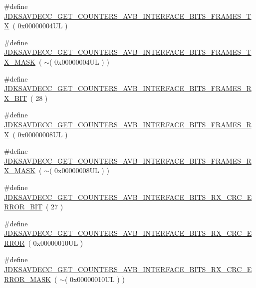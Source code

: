 \begin{DoxyCompactItemize}
\item 
\#define \hyperlink{group__get__counters__avb__interface__bits_gaeab38ba9501d4ed2c8281477ec5dea35}{J\+D\+K\+S\+A\+V\+D\+E\+C\+C\+\_\+\+G\+E\+T\+\_\+\+C\+O\+U\+N\+T\+E\+R\+S\+\_\+\+A\+V\+B\+\_\+\+I\+N\+T\+E\+R\+F\+A\+C\+E\+\_\+\+B\+I\+T\+S\+\_\+\+F\+R\+A\+M\+E\+S\+\_\+\+TX}~( 0x00000004\+U\+L )
\item 
\#define \hyperlink{group__get__counters__avb__interface__bits_ga43a2a0bce896128927e64430fa392132}{J\+D\+K\+S\+A\+V\+D\+E\+C\+C\+\_\+\+G\+E\+T\+\_\+\+C\+O\+U\+N\+T\+E\+R\+S\+\_\+\+A\+V\+B\+\_\+\+I\+N\+T\+E\+R\+F\+A\+C\+E\+\_\+\+B\+I\+T\+S\+\_\+\+F\+R\+A\+M\+E\+S\+\_\+\+T\+X\+\_\+\+M\+A\+SK}~( $\sim$( 0x00000004\+U\+L ) )
\item 
\#define \hyperlink{group__get__counters__avb__interface__bits_ga78de09e07d7cd8492e9e8ba66bddf729}{J\+D\+K\+S\+A\+V\+D\+E\+C\+C\+\_\+\+G\+E\+T\+\_\+\+C\+O\+U\+N\+T\+E\+R\+S\+\_\+\+A\+V\+B\+\_\+\+I\+N\+T\+E\+R\+F\+A\+C\+E\+\_\+\+B\+I\+T\+S\+\_\+\+F\+R\+A\+M\+E\+S\+\_\+\+R\+X\+\_\+\+B\+IT}~( 28 )
\item 
\#define \hyperlink{group__get__counters__avb__interface__bits_gad1441a776134fa0be9fc9136c0fdbe75}{J\+D\+K\+S\+A\+V\+D\+E\+C\+C\+\_\+\+G\+E\+T\+\_\+\+C\+O\+U\+N\+T\+E\+R\+S\+\_\+\+A\+V\+B\+\_\+\+I\+N\+T\+E\+R\+F\+A\+C\+E\+\_\+\+B\+I\+T\+S\+\_\+\+F\+R\+A\+M\+E\+S\+\_\+\+RX}~( 0x00000008\+U\+L )
\item 
\#define \hyperlink{group__get__counters__avb__interface__bits_ga80a6e0d90cabcafb50ae28094fa16e53}{J\+D\+K\+S\+A\+V\+D\+E\+C\+C\+\_\+\+G\+E\+T\+\_\+\+C\+O\+U\+N\+T\+E\+R\+S\+\_\+\+A\+V\+B\+\_\+\+I\+N\+T\+E\+R\+F\+A\+C\+E\+\_\+\+B\+I\+T\+S\+\_\+\+F\+R\+A\+M\+E\+S\+\_\+\+R\+X\+\_\+\+M\+A\+SK}~( $\sim$( 0x00000008\+U\+L ) )
\item 
\#define \hyperlink{group__get__counters__avb__interface__bits_ga88b9162aa8dd6d348de1f90a8847bcf4}{J\+D\+K\+S\+A\+V\+D\+E\+C\+C\+\_\+\+G\+E\+T\+\_\+\+C\+O\+U\+N\+T\+E\+R\+S\+\_\+\+A\+V\+B\+\_\+\+I\+N\+T\+E\+R\+F\+A\+C\+E\+\_\+\+B\+I\+T\+S\+\_\+\+R\+X\+\_\+\+C\+R\+C\+\_\+\+E\+R\+R\+O\+R\+\_\+\+B\+IT}~( 27 )
\item 
\#define \hyperlink{group__get__counters__avb__interface__bits_ga70df08e5ed42f6cc3802a5d5ce17e190}{J\+D\+K\+S\+A\+V\+D\+E\+C\+C\+\_\+\+G\+E\+T\+\_\+\+C\+O\+U\+N\+T\+E\+R\+S\+\_\+\+A\+V\+B\+\_\+\+I\+N\+T\+E\+R\+F\+A\+C\+E\+\_\+\+B\+I\+T\+S\+\_\+\+R\+X\+\_\+\+C\+R\+C\+\_\+\+E\+R\+R\+OR}~( 0x00000010\+U\+L )
\item 
\#define \hyperlink{group__get__counters__avb__interface__bits_gaa03b39ccb2de3121af4559b9dca50269}{J\+D\+K\+S\+A\+V\+D\+E\+C\+C\+\_\+\+G\+E\+T\+\_\+\+C\+O\+U\+N\+T\+E\+R\+S\+\_\+\+A\+V\+B\+\_\+\+I\+N\+T\+E\+R\+F\+A\+C\+E\+\_\+\+B\+I\+T\+S\+\_\+\+R\+X\+\_\+\+C\+R\+C\+\_\+\+E\+R\+R\+O\+R\+\_\+\+M\+A\+SK}~( $\sim$( 0x00000010\+U\+L ) )

\end{DoxyCompactItemize}
